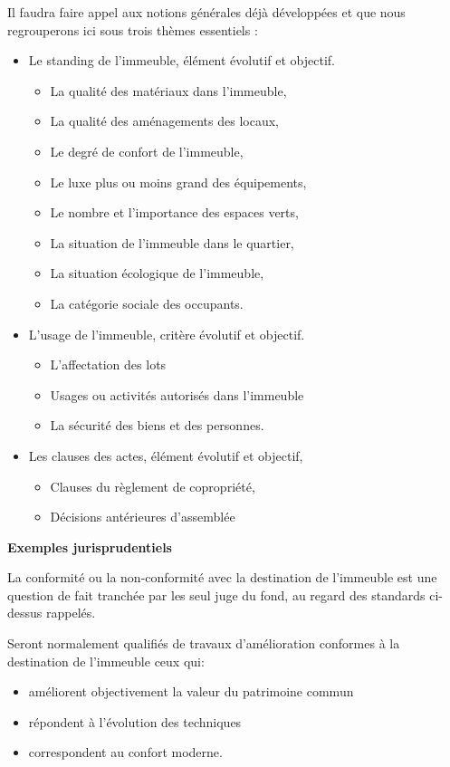 				Il faudra faire appel aux notions générales déjà développées et que nous regrouperons ici sous trois thèmes essentiels :
				\begin{itemize}
					\item Le standing de l’immeuble, élément évolutif et objectif.
						\begin{itemize}
							\item La qualité des matériaux dans l'immeuble,
							\item La qualité des aménagements des locaux,
							\item Le degré de confort de l'immeuble,
							\item Le luxe plus ou moins grand des équipements,
							\item Le nombre et l'importance des espaces verts,
							\item La situation de l'immeuble dans le quartier,
							\item La situation écologique de l'immeuble,
							\item La catégorie sociale des occupants.
						\end{itemize}
					\item L'usage de l'immeuble, critère évolutif et objectif.
						\begin{itemize}
							\item L'affectation des lots
							\item Usages ou activités autorisés dans l’immeuble
							\item La sécurité des biens et des personnes.
						\end{itemize}
					\item Les clauses des actes, élément évolutif et objectif,
						\begin{itemize}
							\item Clauses du règlement de copropriété,
							\item Décisions antérieures d'assemblée
						\end{itemize}
				\end{itemize}
				
				\textbf{Exemples jurisprudentiels}
				
				La conformité ou la non-conformité avec la destination de l’immeuble est une question de fait tranchée par les seul juge du fond, au regard des standards ci-dessus rappelés.
				
				Seront normalement qualifiés de travaux d'amélioration conformes à la destination de l'immeuble ceux qui:
				\begin{itemize}
					\item améliorent objectivement la valeur du patrimoine commun
					\item répondent à l'évolution des techniques
					\item correspondent au confort moderne.
				\end{itemize}
			
